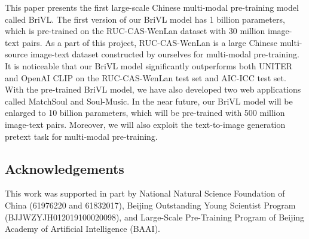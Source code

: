 \documentclass[10pt,twocolumn,letterpaper]{article}
\begin{document}
This paper presents the first large-scale Chinese multi-modal pre-training model called BriVL. The first version of our BriVL model has 1 billion parameters, which is pre-trained on the RUC-CAS-WenLan dataset with 30 million image-text pairs. As a part of this project, RUC-CAS-WenLan is a large Chinese multi-source image-text dataset constructed by ourselves for multi-modal pre-training. It is noticeable that our BriVL model significantly outperforms both UNITER and OpenAI CLIP on the RUC-CAS-WenLan test set and AIC-ICC test set. With the pre-trained BriVL model, we have also developed two web applications called MatchSoul and Soul-Music. In the near future, our BriVL model will be enlarged to 10 billion parameters, which will be pre-trained with 500 million image-text pairs. Moreover, we will also exploit the text-to-image generation pretext task for multi-modal pre-training.

\subsection*{Acknowledgements}

This work was supported in part by National Natural Science Foundation of China (61976220 and 61832017), Beijing Outstanding Young Scientist Program (BJJWZYJH012019100020098), and Large-Scale Pre-Training Program of Beijing Academy of Artificial Intelligence (BAAI).

{

}
\end{document}
